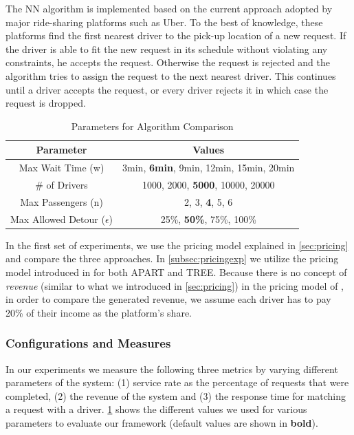 The NN algorithm is implemented based on the current approach adopted by major ride-sharing platforms such as Uber. To the best of knowledge, these platforms find the first nearest driver to the pick-up location of a new request. If the driver is able to fit the new request in its schedule without violating any constraints, he accepts the request. Otherwise the request is rejected and the algorithm tries to assign the request to the next nearest driver. This continues until a driver accepts the request, or every driver rejects it in which case the request is dropped.


\begin{table}[!ht]
	\begin{center}
		\begin{tabular}{|c|c|}
			\hline
			Parameter & Values \\
			\hline \hline
			Max Wait Time (w) & 3min, \textbf{6min}, 9min, 12min, 15min, 20min \\ 
			\hline
			\# of Drivers & 1000, 2000, \textbf{5000},  10000, 20000\\ 
			\hline
			Max Passengers (n) & 2, 3, \textbf{4}, 5, 6 \\
			\hline
			Max Allowed Detour ($\epsilon$) & 25\%, \textbf{50\%}, 75\%, 100\%\\
			\hline
		\end{tabular}
		\caption{Parameters for Algorithm Comparison}
		\label{tab:params}
	\end{center}
	\vspace{-5mm}
\end{table}

In the first set of experiments, we use the pricing model explained in \cref{sec:pricing} and compare the three approaches. In \cref{subsec:pricingexp} we utilize the pricing model introduced in \cite{Ma15} for both APART and TREE. Because there is no concept of \textit{revenue} (similar to what we introduced in \cref{sec:pricing}) in the pricing model of \cite{Ma15}, in order to compare the generated revenue, we assume each driver has to pay 20\% of their income as the platform's share.

\subsubsection{Configurations and Measures}
In our experiments we measure the following three metrics by varying different parameters of the system: (1) service rate as the percentage of requests that were completed, (2) the revenue of the system and (3) the response time for matching a request with a driver. \cref{tab:params} shows the different values we used for various parameters to evaluate our framework (default values are shown in \textbf{bold}).

